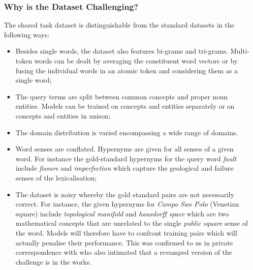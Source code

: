 \subsubsection{Why is the Dataset Challenging?}
The shared task dataset is distinguishable from the standard datasets in the following ways:
\begin{itemize}
    \item Besides single words, the dataset also features bi-grams and tri-grams.  Multi-token words can be dealt by averaging the constituent word vectors or by fusing the individual words in an atomic token and considering them as a single word; 
    \item The query terms are split between common concepts and proper noun entities.  Models can be trained on concepts and entities separately or on concepts and entities in unison;
    \item The domain distribution is varied encompassing a wide range of domains.  
    \item Word senses are conflated.  Hypernyms are given for all senses of a given word.  For instance the gold-standard hypernyms for the query word \textit{fault} include \textit{fissure} and \textit{imperfection} which capture the geological and failure senses of the lexicalisation;
    \item The dataset is noisy whereby the gold standard pairs are not necessarily correct.  For instance, the given hypernyms for \textit{Campo San Polo} (Venetian square) include \textit{topological manifold} and \textit{hausdorff space} which are two mathematical concepts that are unrelated to the single \textit{public square} sense of the word.  Models will therefore have to confront training pairs which will actually penalise their performance.  This was confirmed to us in private correspondence with \citeauthor{camacho2018semeval} who also intimated that a revamped version of the challenge is in the works.
\end{itemize}
